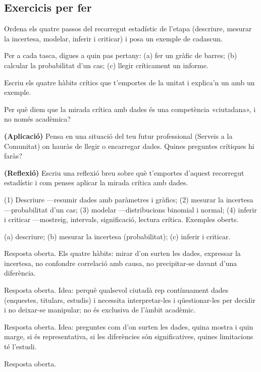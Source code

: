 \subsection{Exercicis per fer}

\begin{exercicis}
\begin{exlist}
  \item Ordena els quatre passos del recorregut estadístic de l'etapa (descriure, mesurar
        la incertesa, modelar, inferir i criticar) i posa un exemple de cadascun.
  \item Per a cada tasca, digues a quin pas pertany: (a) fer un gràfic de barres; (b)
        calcular la probabilitat d'un cas; (c) llegir críticament un informe.
  \item Escriu els quatre hàbits crítics que t'emportes de la unitat i explica'n un amb un
        exemple.
  \item Per què diem que la mirada crítica amb dades és una competència «ciutadana», i no
        només acadèmica?
  \item \textbf{(Aplicació)} Pensa en una situació del teu futur professional (Serveis a la
        Comunitat) on hauràs de llegir o encarregar dades. Quines preguntes crítiques hi
        faràs?
  \item \textbf{(Reflexió)} Escriu una reflexió breu sobre què t'emportes d'aquest
        recorregut estadístic i com penses aplicar la mirada crítica amb dades.
\end{exlist}
\end{exercicis}

\begin{solucions}
\begin{sollist}
  \item (1) Descriure —resumir dades amb paràmetres i gràfics; (2) mesurar la incertesa
        —probabilitat d'un cas; (3) modelar —distribucions binomial i normal; (4) inferir i
        criticar —mostreig, intervals, significació, lectura crítica. Exemples oberts.
  \item (a) descriure; (b) mesurar la incertesa (probabilitat); (c) inferir i criticar.
  \item Resposta oberta. Els quatre hàbits: mirar d'on surten les dades, expressar la
        incertesa, no confondre correlació amb causa, no precipitar-se davant d'una
        diferència.
  \item Resposta oberta. Idea: perquè qualsevol ciutadà rep contínuament dades (enquestes,
        titulars, estudis) i necessita interpretar-les i qüestionar-les per decidir i no
        deixar-se manipular; no és exclusiva de l'àmbit acadèmic.
  \item Resposta oberta. Idea: preguntes com d'on surten les dades, quina mostra i quin
        marge, si és representativa, si les diferències són significatives, quines
        limitacions té l'estudi.
  \item Resposta oberta.
\end{sollist}
\end{solucions}
